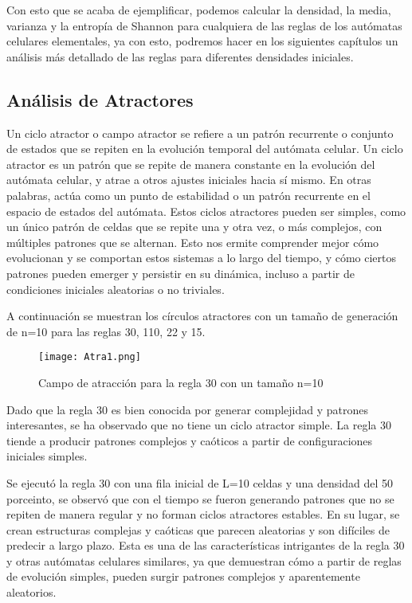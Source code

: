 \documentclass{article}
\begin{document}
	Con esto que se acaba de ejemplificar, podemos calcular la densidad, la media, varianza y la entropía de Shannon para cualquiera de las reglas de los autómatas celulares elementales, ya con esto, podremos hacer en los siguientes capítulos un análisis más detallado de las reglas para diferentes densidades iniciales. 
	
	\subsection{Análisis de Atractores}
	
	Un ciclo atractor o campo atractor se refiere a un patrón recurrente o conjunto de estados que se repiten en la evolución temporal del autómata celular.
	Un ciclo atractor es un patrón que se repite de manera constante en la evolución del autómata celular, y atrae a otros ajustes iniciales hacia sí mismo. En otras palabras, actúa como un punto de estabilidad o un patrón recurrente en el espacio de estados del autómata. Estos ciclos atractores pueden ser simples, como un único patrón de celdas que se repite una y otra vez, o más complejos, con múltiples patrones que se alternan.
	Esto nos ermite comprender mejor cómo evolucionan y se comportan estos sistemas a lo largo del tiempo, y cómo ciertos patrones pueden emerger y persistir en su dinámica, incluso a partir de condiciones iniciales aleatorias o no triviales. 
	
	A continuación se muestran los círculos atractores con un tamaño de generación de n=10 para las reglas 30, 110, 22 y 15. 
	
	\begin{figure}[h]
		\centering       
		\texttt{[image: Atra1.png]}
		\caption{Campo de atracción para la regla 30 con un tamaño n=10}
		\label{fig:mi_imagen1}
	\end{figure}
	
	Dado que la regla 30 es bien conocida por generar complejidad y patrones interesantes, se ha observado que no tiene un ciclo atractor simple. La regla 30 tiende a producir patrones complejos y caóticos a partir de configuraciones iniciales simples.
	
	Se ejecutó la regla 30 con una fila inicial de L=10 celdas y una densidad del 50 porceinto, se observó que con el tiempo se fueron generando patrones que no se repiten de manera regular y no forman ciclos atractores estables. En su lugar, se crean estructuras complejas y caóticas que parecen aleatorias y son difíciles de predecir a largo plazo. Esta es una de las características intrigantes de la regla 30 y otras autómatas celulares similares, ya que demuestran cómo a partir de reglas de evolución simples, pueden surgir patrones complejos y aparentemente aleatorios.
	
\end{document}

